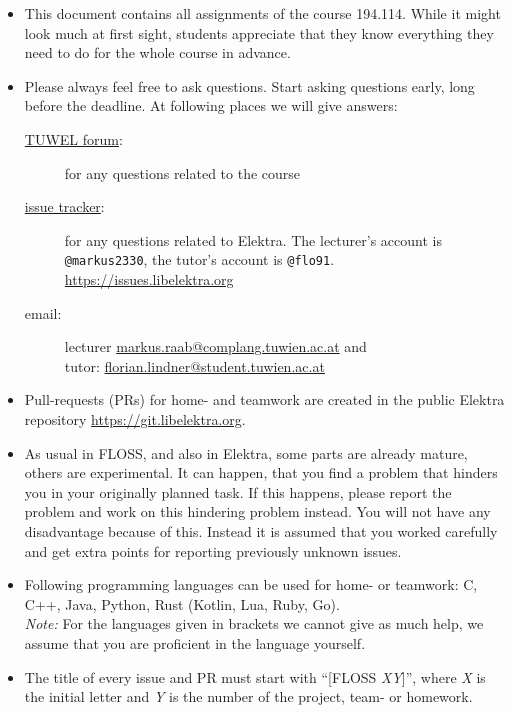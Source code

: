 \documentclass[11pt,a4paper]{article}
\def\mynr{194.114}
\def\myterm{2023W}
\newcommand{\anm}[1]{\marginpar{\sffamily\footnotesize\raggedright\color{aktiv}{#1}}}
\newcommand{\languages}[1]{C, C++, Java, Python, Rust (Kotlin, Lua, Ruby, Go)}
\begin{document}
\begin{itemize}
\item This document contains all assignments of the course \mynr.
	While it might look much at first sight, students appreciate that they know everything they need to do for the whole course in advance.
\item Please always feel free to ask questions.
	Start asking questions early, long before the deadline.
	At following places we will give answers:
	\begin{description}
	\item[\href{https://tuwel.tuwien.ac.at/mod/moodleoverflow/view.php?id=1661080}{TUWEL forum}:] for any questions related to the course
	\item[\href{https://issues.libelektra.org}{issue tracker}:] for any questions related to Elektra.
		The lecturer's account is \texttt{@markus2330}, the tutor's account is \texttt{@flo91}.
		\\ \url{https://issues.libelektra.org}
	\item[email:] lecturer \href{mailto:markus.raab@complang.tuwien.ac.at?subject=FLOSS \myterm}{markus.raab@complang.tuwien.ac.at} and \\
		tutor: \href{mailto:florian.lindner@student.tuwien.ac.at?subject=FLOSS \myterm}{florian.lindner@student.tuwien.ac.at}
	\end{description}
\item Pull-requests (PRs) for home- and teamwork are created in the public Elektra repository \url{https://git.libelektra.org}.
\item As usual in FLOSS, and also in Elektra, some parts are already mature, others are experimental.
	It can happen, that you find a problem that hinders you in your originally planned task.
	If this happens, please report the problem and work on this hindering problem instead.
	You will not have any disadvantage because of this.
	Instead it is assumed that you worked carefully and get extra points\anm{Up to 3 extra points.} for reporting previously unknown issues.
\item Following programming languages can be used for home- or teamwork:
	\languages{}. \\
	\textit{Note:} For the languages given in brackets we cannot give as much help, we assume that you are proficient in the language yourself.
\item The title of every issue and PR must start with ``[FLOSS \textit{XY}]'', where \textit{X} is the initial letter and \textit{Y} is the number of the project, team- or homework.

\end{itemize}
\end{document}
